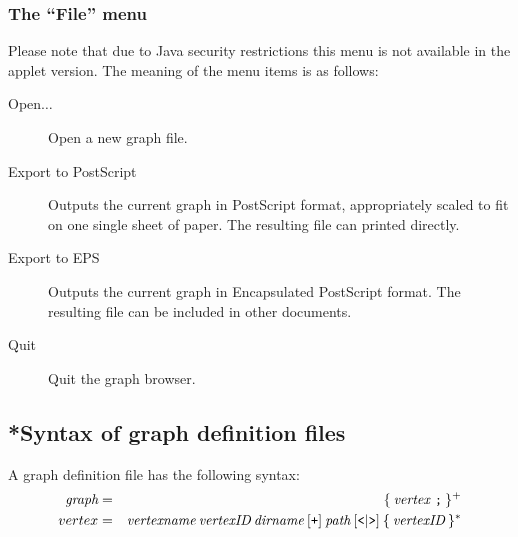 \subsubsection*{The ``File'' menu}

Please note that due to Java security restrictions this menu is not
available in the applet version. The meaning of the menu items is as
follows:
\begin{description}
  
\item[Open$\ldots$] Open a new graph file.
  
\item[Export to PostScript] Outputs the current graph in {\sc
    PostScript} format, appropriately scaled to fit on one single
  sheet of paper.  The resulting file can printed directly.
  
\item[Export to EPS] Outputs the current graph in Encapsulated {\sc
    PostScript} format. The resulting file can be included in other
  documents.

\item[Quit] Quit the graph browser.

\end{description}


\subsection*{*Syntax of graph definition files}

A graph definition file has the following syntax:
\begin{eqnarray*}
  \mbox{\it graph} & = & \{ \: \mbox{\it vertex \tt ;} \: \} ^ + \\
  vertex & = & \mbox{\it vertexname} \: \mbox{\it vertexID} \: \mbox{\it dirname} \: [ \mbox{\tt +} ]
  \: \mbox{\it path} \: [ \mbox{\tt <} | \mbox{\tt >} ] \: \{ \: \mbox{\it vertexID} \: \} ^ *
\end{eqnarray*}

